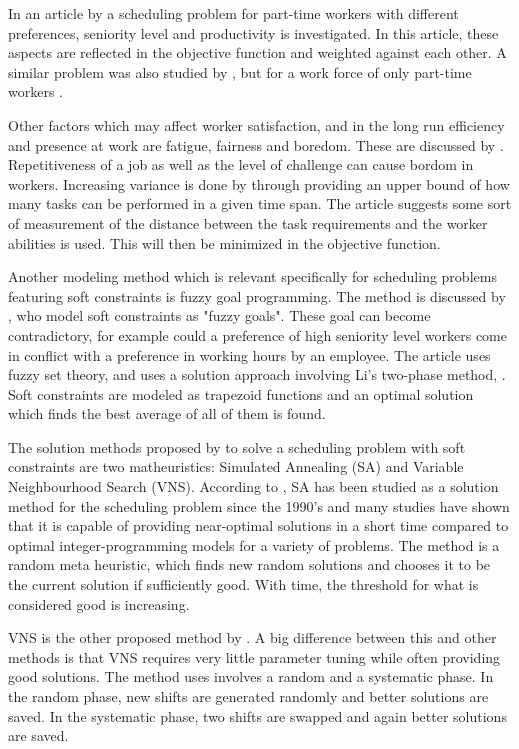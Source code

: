  In an article by \citet{akbari_2013} a scheduling problem for part-time workers with different preferences, seniority level and productivity is investigated. In this article, these aspects are reflected in the objective function and weighted against each other. A similar problem was also studied by \citet{mohan_2008}, but for a work force of only part-time workers . %

Other factors which may affect worker satisfaction, and in the long run efficiency and presence at work are fatigue, fairness and boredom. These are discussed by  \citet{eiselt_2008}. Repetitiveness of a job as well as the level of challenge can cause bordom in workers. Increasing variance is done by \citet{eiselt_2008} through providing an upper bound of how many tasks can be performed in a given time span. The article suggests some sort of measurement of the distance between the task requirements and the worker abilities is used. This will then be minimized in the objective function.

Another modeling method which is relevant specifically for scheduling problems featuring soft constraints is fuzzy goal programming. The method is discussed by \citet{shahnazari_2013}, who model soft constraints as "fuzzy goals". These goal can become contradictory, for example could a preference of high seniority level workers come in conflict with a preference in working hours by an employee. The article uses fuzzy set theory, and uses a solution approach involving Li's two-phase method, \citet{lee_1989}. Soft constraints are modeled as trapezoid functions and an optimal solution which finds the best average of all of them is found.

The solution methods proposed by \citet{akbari_2013} to solve a scheduling problem with soft constraints are two matheuristics: Simulated Annealing (SA) and Variable Neighbourhood Search (VNS). According to \citet{akbari_2013}, SA has been studied as a solution method for the scheduling problem since the 1990's and many studies have shown that it is capable of providing near-optimal solutions in a short time compared to optimal integer-programming models for a variety of problems. The method is a random meta heuristic, which finds new random solutions and chooses it to be the current solution if sufficiently good. With time, the threshold for what is considered good is increasing. 

VNS is the other proposed method by \citet{akbari_2013}. A big difference between this and other methods is that VNS requires very little parameter tuning while often providing good solutions. The method uses involves  a random and a systematic phase. In the random phase, new shifts are generated randomly and better solutions are saved. In the systematic phase, two shifts are swapped and again better solutions are saved.

